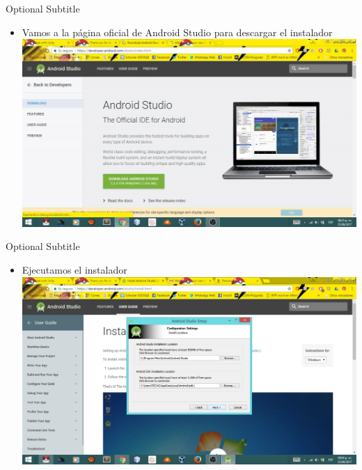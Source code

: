 \documentclass{beamer}
\begin{document}
\begin{frame}{11}{Optional Subtitle}
  \begin{itemize}
  \item {
    Vamos a la página oficial de Android Studio para descargar el instalador
  }
  \includegraphics[width=\linewidth]{image/IU11}
  \end{itemize}
\end{frame}

\begin{frame}{12}{Optional Subtitle}
  \begin{itemize}
  \item {
    Ejecutamos el instalador
  }
  \includegraphics[width=\linewidth]{image/IU12}
  \end{itemize}
\end{frame}
\end{document}
